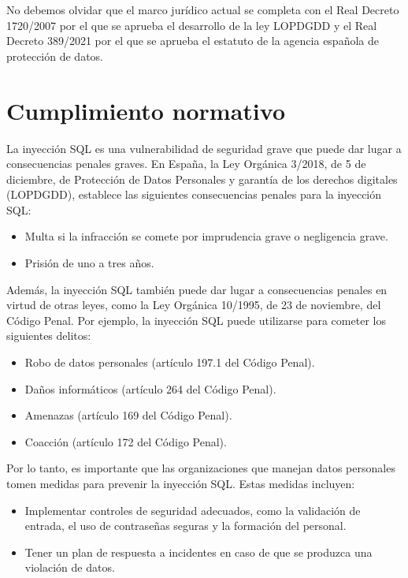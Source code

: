 \documentclass[11pt]{report}
\begin{document}
No debemos olvidar que el marco jurídico actual se completa con el Real Decreto 1720/2007 por el que se aprueba el desarrollo de la ley LOPDGDD y el Real Decreto 389/2021 
por el que se aprueba el estatuto de la agencia española de protección de datos.

\cleardoublepage

\section{Cumplimiento normativo}
La inyección SQL es una vulnerabilidad de seguridad grave que puede dar lugar a consecuencias penales graves. En España, la Ley Orgánica 3/2018,
de 5 de diciembre, de Protección de Datos Personales y garantía de los derechos digitales (LOPDGDD), establece las siguientes consecuencias penales
para la inyección SQL:
\begin{itemize}
  \item Multa si la infracción se comete por imprudencia grave o negligencia grave.
  \item Prisión de uno a tres años.
\end{itemize}

Además, la inyección SQL también puede dar lugar a consecuencias penales en virtud de otras leyes, como la Ley Orgánica 10/1995, de 23 de noviembre,
del Código Penal. Por ejemplo, la inyección SQL puede utilizarse para cometer los siguientes delitos:
\begin{itemize}
  \item Robo de datos personales (artículo 197.1 del Código Penal).
  \item Daños informáticos (artículo 264 del Código Penal).
  \item Amenazas (artículo 169 del Código Penal).
  \item Coacción (artículo 172 del Código Penal).
\end{itemize}

Por lo tanto, es importante que las organizaciones que manejan datos personales tomen medidas para prevenir la inyección SQL. Estas medidas incluyen:
\begin{itemize}
  \item Implementar controles de seguridad adecuados, como la validación de entrada, el uso de contraseñas seguras y la formación del personal.
  \item Tener un plan de respuesta a incidentes en caso de que se produzca una violación de datos.
\end{itemize}
\end{document}
